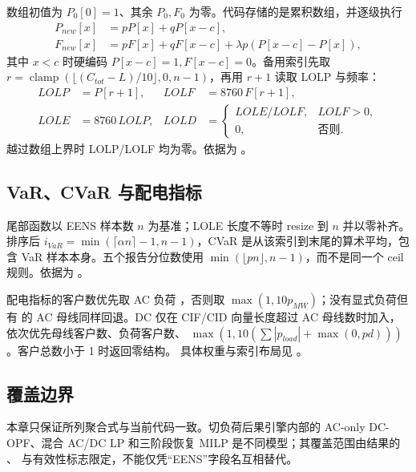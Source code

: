 数组初值为 $P_0[0]=1$、其余 $P_0,F_0$ 为零。代码存储的是累积数组，并逐级执行
\begin{align}
 P_{new}[x]&=pP[x]+qP[x-c],\\
 F_{new}[x]&=pF[x]+qF[x-c]+\lambda p(P[x-c]-P[x]),
\end{align}
其中 $x<c$ 时硬编码 $P[x-c]=1,F[x-c]=0$。备用索引先取
$r=\operatorname{clamp}(\lfloor(C_{tot}-L)/10\rfloor,0,n-1)$，再用 $r+1$ 读取
LOLP 与频率：
\begin{align}
 LOLP&=P[r+1], & LOLF&=8760\,F[r+1],\\
 LOLE&=8760\,LOLP, & LOLD&=\begin{cases}LOLE/LOLF,&LOLF>0,\\0,&\text{否则}.\end{cases}
\end{align}
越过数组上界时 LOLP/LOLF 均为零。依据为
。

\subsection{VaR、CVaR 与配电指标}

尾部函数以 EENS 样本数 $n$ 为基准；LOLE 长度不等时 resize 到 $n$ 并以零补齐。排序后
$i_{VaR}=\min(\lceil\alpha n\rceil-1,n-1)$，CVaR 是从该索引到末尾的算术平均，包含 VaR
样本本身。五个报告分位数使用
$\min(\lfloor pn\rfloor,n-1)$，而不是同一个 ceil 规则。依据为
。

配电指标的客户数优先取 AC 负荷 ，否则取
$\max(1,10p_{MW})$；没有显式负荷但有  的 AC 母线同样回退。DC 仅在 CIF/CID
向量长度超过 AC 母线数时加入，依次优先母线客户数、负荷客户数、
$\max(1,10(\sum|p_{load}|+\max(0,pd)))$。客户总数小于 1 时返回零结构。
具体权重与索引布局见 。

\subsection{覆盖边界}

本章只保证所列聚合式与当前代码一致。切负荷后果引擎内部的 AC-only DC-OPF、混合 AC/DC LP
和三阶段恢复 MILP 是不同模型；其覆盖范围由结果的 、
 与有效性标志限定，不能仅凭“EENS”字段名互相替代。

